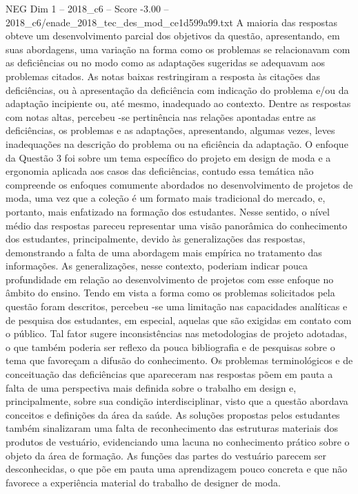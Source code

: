 \begin{textsample}{NEG Dim 1 – 2018\_c6 – Score -3.00 – 2018\_c6/enade\_2018\_tec\_des\_mod\_ce1d599a99.txt}
A maioria das respostas obteve um desenvolvimento parcial dos objetivos da questão, apresentando, em suas abordagens, uma variação na forma como os problemas se relacionavam com as deficiências ou no modo como as adaptações sugeridas se adequavam aos problemas citados.
As notas baixas restringiram a resposta às citações das deficiências, ou à apresentação da deficiência com indicação do problema e/ou da adaptação incipiente ou, até mesmo, inadequado ao contexto.
Dentre as respostas com notas altas, percebeu -se pertinência nas relações apontadas entre as deficiências, os problemas e as adaptações, apresentando, algumas vezes, leves inadequações na descrição do problema ou na eficiência da adaptação.
O enfoque da Questão 3 foi sobre um tema específico do projeto em design de moda e a ergonomia aplicada aos casos das deficiências, contudo essa temática não compreende os enfoques comumente abordados no desenvolvimento de projetos de moda, uma vez que a coleção é um formato mais tradicional do mercado, e, portanto, mais enfatizado na formação dos estudantes.
Nesse sentido, o nível médio das respostas pareceu representar uma visão panorâmica do conhecimento dos estudantes, principalmente, devido às generalizações das respostas, demonstrando a falta de uma abordagem mais empírica no tratamento das informações.
As generalizações, nesse contexto, poderiam indicar pouca profundidade em relação ao desenvolvimento de projetos com esse enfoque no âmbito do ensino.
Tendo em vista a forma como os problemas solicitados pela questão foram descritos, percebeu -se uma limitação nas capacidades analíticas e de pesquisa dos estudantes, em especial, aquelas que são exigidas em contato com o público.
Tal fator sugere inconsistências nas metodologias de projeto adotadas, o que também poderia ser reflexo da pouca bibliografia e de pesquisas sobre o tema que favoreçam a difusão do conhecimento.
Os problemas terminológicos e de conceituação das deficiências que apareceram nas respostas põem em pauta a falta de uma perspectiva mais definida sobre o trabalho em design e, principalmente, sobre sua condição interdisciplinar, visto que a questão abordava conceitos e definições da área da saúde.
As soluções propostas pelos estudantes também sinalizaram uma falta de reconhecimento das estruturas materiais dos produtos de vestuário, evidenciando uma lacuna no conhecimento prático sobre o objeto da área de formação.
As funções das partes do vestuário parecem ser desconhecidas, o que põe em pauta uma aprendizagem pouco concreta e que não favorece a experiência material do trabalho de designer de moda.

\end{textsample}
